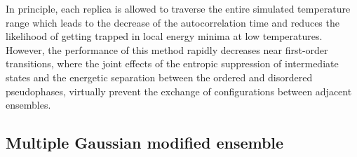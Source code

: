 \documentclass[12pt]{report}
\begin{document}
In principle, each replica is allowed to traverse the entire simulated
temperature range which leads to the decrease of the autocorrelation time and reduces the likelihood of getting trapped in local energy minima at low temperatures. However, the performance of this method rapidly decreases near first-order transitions, where the joint effects of the entropic suppression of intermediate states and the energetic separation between the ordered and disordered pseudophases, virtually prevent the exchange of configurations between adjacent ensembles.
 
\subsection{Multiple Gaussian modified ensemble}
\label{subsec:GaussianEnsemble}
\end{document}
